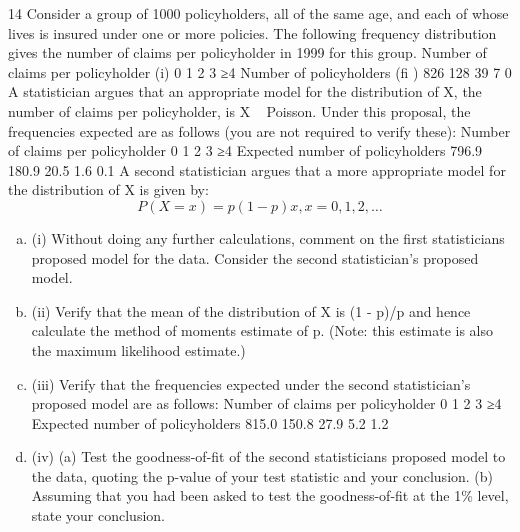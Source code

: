 \documentclass[a4paper,12pt]{article}
\begin{document}
\item 
14 Consider a group of 1000 policyholders, all of the same age, and each of whose
lives is insured under one or more policies. The following frequency distribution
gives the number of claims per policyholder in 1999 for this group.
Number of claims per policyholder (i) 0 1 2 3 ≥4
Number of policyholders (fi ) 826 128 39 7 0
A statistician argues that an appropriate model for the distribution of X, the
number of claims per policyholder, is X ~ Poisson. Under this proposal, the
frequencies expected are as follows (you are not required to verify these):
Number of claims per policyholder 0 1 2 3 ≥4
Expected number of policyholders 796.9 180.9 20.5 1.6 0.1
A second statistician argues that a more appropriate model for the distribution of
X is given by:
\[P(X = x) = p(1 − p)x , x = 0, 1, 2,\ldots\]
\begin{enumerate}[(a)]
    \item (i) Without doing any further calculations, comment on the first statisticians
proposed model for the data. 
Consider the second statistician's proposed model.
\item (ii) Verify that the mean of the distribution of X is (1 \;-\; p)/p and hence
calculate the method of moments estimate of p. 
(Note: this estimate is also the maximum likelihood estimate.)
\item (iii) Verify that the frequencies expected under the second statistician's
proposed model are as follows:
Number of claims per policyholder 0 1 2 3 ≥4
Expected number of policyholders 815.0 150.8 27.9 5.2 1.2

\item (iv) (a) Test the goodness-of-fit of the second statisticians proposed model
to the data, quoting the p-value of your test statistic and your
conclusion.
(b) Assuming that you had been asked to test the goodness-of-fit at
the 1\% level, state your conclusion.
\end{enumerate}
\end{document}
